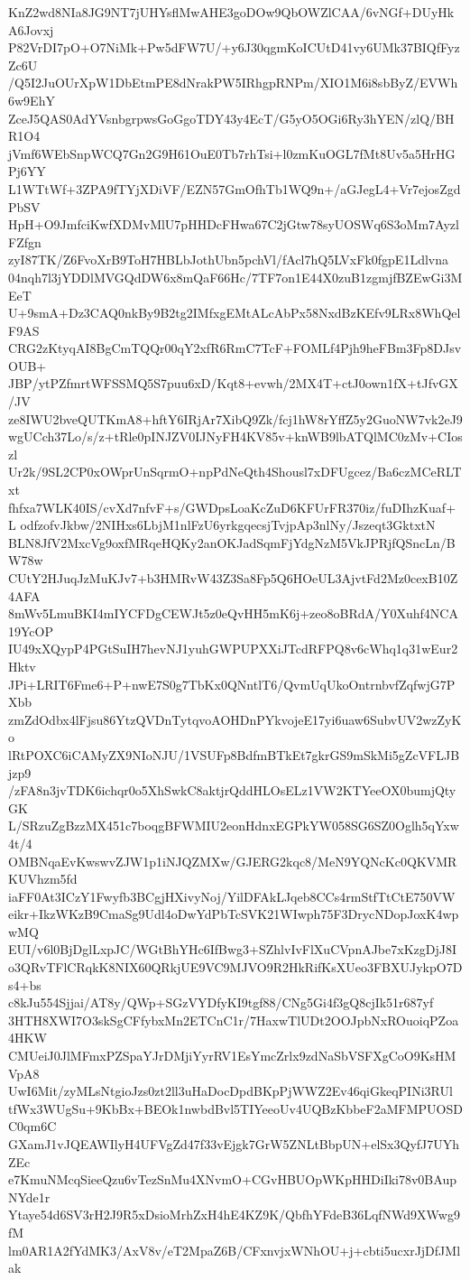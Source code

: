 KnZ2wd8NIa8JG9NT7jUHYsflMwAHE3goDOw9QbOWZlCAA/6vNGf+DUyHkA6Jovxj
P82VrDI7pO+O7NiMk+Pw5dFW7U/+y6J30qgmKoICUtD41vy6UMk37BIQfFyzZc6U
/Q5I2JuOUrXpW1DbEtmPE8dNrakPW5IRhgpRNPm/XIO1M6i8sbByZ/EVWh6w9EhY
ZceJ5QAS0AdYVsnbgrpwsGoGgoTDY43y4EcT/G5yO5OGi6Ry3hYEN/zlQ/BHR1O4
jVmf6WEbSnpWCQ7Gn2G9H61OuE0Tb7rhTsi+l0zmKuOGL7fMt8Uv5a5HrHGPj6YY
L1WTtWf+3ZPA9fTYjXDiVF/EZN57GmOfhTb1WQ9n+/aGJegL4+Vr7ejosZgdPbSV
HpH+O9JmfciKwfXDMvMlU7pHHDcFHwa67C2jGtw78syUOSWq6S3oMm7AyzlFZfgn
zyI87TK/Z6FvoXrB9ToH7HBLbJothUbn5pchVl/fAcl7hQ5LVxFk0fgpE1Ldlvna
04nqh7l3jYDDlMVGQdDW6x8mQaF66Hc/7TF7on1E44X0zuB1zgmjfBZEwGi3MEeT
U+9smA+Dz3CAQ0nkBy9B2tg2IMfxgEMtALcAbPx58NxdBzKEfv9LRx8WhQelF9AS
CRG2zKtyqAI8BgCmTQQr00qY2xfR6RmC7TcF+FOMLf4Pjh9heFBm3Fp8DJsvOUB+
JBP/ytPZfmrtWFSSMQ5S7puu6xD/Kqt8+evwh/2MX4T+ctJ0own1fX+tJfvGX/JV
ze8IWU2bveQUTKmA8+hftY6IRjAr7XibQ9Zk/fcj1hW8rYffZ5y2GuoNW7vk2eJ9
wgUCch37Lo/s/z+tRle0pINJZV0IJNyFH4KV85v+knWB9lbATQlMC0zMv+CIoszl
Ur2k/9SL2CP0xOWprUnSqrmO+npPdNeQth4Shousl7xDFUgcez/Ba6czMCeRLTxt
fhfxa7WLK40IS/cvXd7nfvF+s/GWDpsLoaKcZuD6KFUrFR370iz/fuDIhzKuaf+L
odfzofvJkbw/2NIHxs6LbjM1nlFzU6yrkgqecsjTvjpAp3nlNy/Jszeqt3GktxtN
BLN8JfV2MxcVg9oxfMRqeHQKy2anOKJadSqmFjYdgNzM5VkJPRjfQSncLn/BW78w
CUtY2HJuqJzMuKJv7+b3HMRvW43Z3Sa8Fp5Q6HOeUL3AjvtFd2Mz0cexB10Z4AFA
8mWv5LmuBKI4mIYCFDgCEWJt5z0eQvHH5mK6j+zeo8oBRdA/Y0Xuhf4NCA19YcOP
IU49xXQypP4PGtSuIH7hevNJ1yuhGWPUPXXiJTcdRFPQ8v6cWhq1q31wEur2Hktv
JPi+LRIT6Fme6+P+nwE7S0g7TbKx0QNntlT6/QvmUqUkoOntrnbvfZqfwjG7PXbb
zmZdOdbx4lFjsu86YtzQVDnTytqvoAOHDnPYkvojeE17yi6uaw6SubvUV2wzZyKo
lRtPOXC6iCAMyZX9NIoNJU/1VSUFp8BdfmBTkEt7gkrGS9mSkMi5gZcVFLJBjzp9
/zFA8n3jvTDK6ichqr0o5XhSwkC8aktjrQddHLOsELz1VW2KTYeeOX0bumjQtyGK
L/SRzuZgBzzMX451c7boqgBFWMIU2eonHdnxEGPkYW058SG6SZ0Oglh5qYxw4t/4
OMBNqaEvKwswvZJW1p1iNJQZMXw/GJERG2kqc8/MeN9YQNcKc0QKVMRKUVhzm5fd
iaFF0At3ICzY1Fwyfb3BCgjHXivyNoj/YilDFAkLJqeb8CCs4rmStfTtCtE750VW
eikr+IkzWKzB9CmaSg9Udl4oDwYdPbTcSVK21WIwph75F3DrycNDopJoxK4wpwMQ
EUI/v6l0BjDglLxpJC/WGtBhYHc6IfBwg3+SZhlvIvFlXuCVpnAJbe7xKzgDjJ8I
o3QRvTFlCRqkK8NIX60QRkjUE9VC9MJVO9R2HkRifKsXUeo3FBXUJykpO7Ds4+bs
c8kJu554Sjjai/AT8y/QWp+SGzVYDfyKI9tgf88/CNg5Gi4f3gQ8cjIk51r687yf
3HTH8XWI7O3skSgCFfybxMn2ETCnC1r/7HaxwTlUDt2OOJpbNxROuoiqPZoa4HKW
CMUeiJ0JlMFmxPZSpaYJrDMjiYyrRV1EsYmcZrlx9zdNaSbVSFXgCoO9KsHMVpA8
UwI6Mit/zyMLsNtgioJzs0zt2ll3uHaDocDpdBKpPjWWZ2Ev46qiGkeqPINi3RUl
tfWx3WUgSu+9KbBx+BEOk1nwbdBvl5TIYeeoUv4UQBzKbbeF2aMFMPUOSDC0qm6C
GXamJ1vJQEAWIlyH4UFVgZd47f33vEjgk7GrW5ZNLtBbpUN+elSx3QyfJ7UYhZEc
e7KmuNMcqSieeQzu6vTezSnMu4XNvmO+CGvHBUOpWKpHHDiIki78v0BAupNYde1r
Ytaye54d6SV3rH2J9R5xDsioMrhZxH4hE4KZ9K/QbfhYFdeB36LqfNWd9XWwg9fM
lm0AR1A2fYdMK3/AxV8v/eT2MpaZ6B/CFxnvjxWNhOU+j+cbti5ucxrJjDfJMlak
